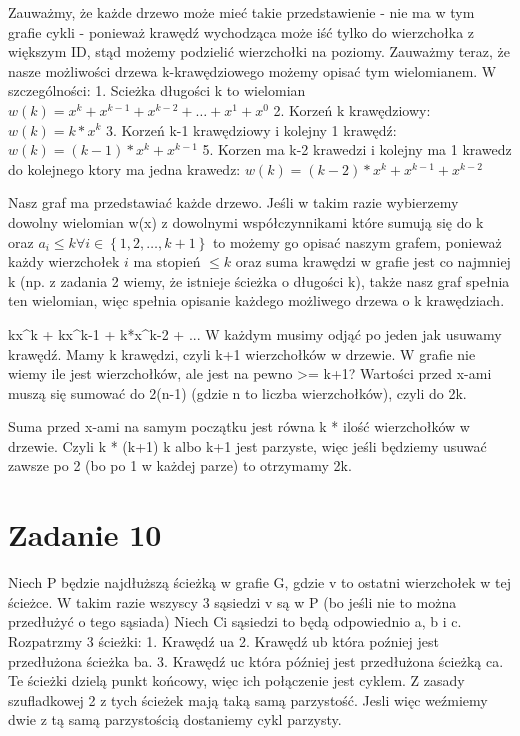 \documentclass[12pt]{article}
\newcommand{\set}[1]{\left \{ #1 \right \}}				%
\begin{document}
Zauważmy, że każde drzewo może mieć takie przedstawienie - nie ma w tym grafie cykli - ponieważ krawędź wychodząca może iść tylko do wierzchołka z większym ID, stąd możemy podzielić wierzchołki na poziomy.
Zauważmy teraz, że nasze możliwości drzewa k-krawędziowego możemy opisać tym wielomianem. W szczególności:
1. Scieżka długości k to wielomian $w(k) = x^k + x^{k-1} + x^{k-2} + \dots + x^1 + x^0$
2. Korzeń k krawędziowy: $w(k) = k*x^k$
3. Korzeń k-1 krawędziowy i kolejny 1 krawędź: $w(k) = (k-1)*x^k + x^{k-1}$
5. Korzen ma k-2 krawedzi i kolejny ma 1 krawedz do kolejnego ktory ma jedna krawedz: $w(k) = (k-2)*x^k + x^{k-1} + x^{k-2}$

Nasz graf ma przedstawiać każde drzewo. Jeśli w takim razie wybierzemy dowolny wielomian w(x) z dowolnymi współczynnikami które sumują się do k oraz $a_i \leq k \forall i \in \set{1, 2, \dots, k+1}$ to możemy go opisać naszym grafem, ponieważ każdy wierzchołek $i$ ma stopień $\leq k$ oraz suma krawędzi w grafie jest co najmniej k (np. z zadania 2 wiemy, że istnieje ścieżka o długości k), także nasz graf spełnia ten wielomian, więc spełnia opisanie każdego możliwego drzewa o k krawędziach.


kx^k + kx^{k-1} + k*x^{k-2} + ... 
W każdym musimy odjąć po jeden jak usuwamy krawędź.
Mamy k krawędzi, czyli k+1 wierzchołków w drzewie. 
W grafie nie wiemy ile jest wierzchołków, ale jest na pewno >= k+1?
Wartości przed x-ami muszą się sumować do 2(n-1) (gdzie n to liczba wierzchołków), czyli do 2k.

Suma przed x-ami na samym początku jest równa k * ilość wierzchołków w drzewie. Czyli k * (k+1)
k albo k+1 jest parzyste, więc jeśli będziemy usuwać zawsze po 2 (bo po 1 w każdej parze) to otrzymamy 2k. 


\section{Zadanie 10}
Niech P będzie najdłuższą ścieżką w grafie G, gdzie v to ostatni wierzchołek w tej ścieżce.
W takim razie wszyscy 3 sąsiedzi v są w P (bo jeśli nie to można przedłużyć o tego sąsiada)
Niech Ci sąsiedzi to będą odpowiednio a, b i c.
Rozpatrzmy 3 ścieżki: 
1. Krawędź ua 
2. Krawędź ub która poźniej jest przedłużona ścieżka ba. 
3. Krawędź uc która później jest przedłużona ścieżką ca. 
Te ścieżki dzielą punkt końcowy, więc ich połączenie jest cyklem.
Z zasady szufladkowej 2 z tych ścieżek mają taką samą parzystość. 
Jesli więc weźmiemy dwie z tą samą parzystością dostaniemy cykl parzysty.



\egroup
\end{document}
